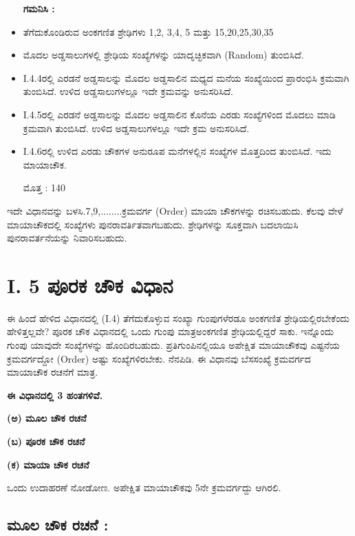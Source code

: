 \begin{itemize}
	\textbf{ಗಮನಿಸಿ :}
	\smallskip

	\item ತೆಗೆದುಕೊಂಡಿರುವ ಅಂಕಗಣಿತ ಶ್ರೇಢಿಗಳು 1,2, 3,4, 5 ಮತ್ತು 15,20,25,30,35
	\item ಮೊದಲ ಅಡ್ಡಸಾಲುಗಳಲ್ಲಿ ಶ್ರೇಢಿಯ ಸಂಖ್ಯೆಗಳನ್ನು ಯಾದೃಚ್ಛಿಕವಾಗಿ (Random) ತುಂಬಿಸಿದೆ.
	\item I.4.4ರಲ್ಲಿ ಎರಡನೆ ಅಡ್ಡಸಾಲನ್ನು ಮೊದಲ ಅಡ್ಡಸಾಲಿನ ಮಧ್ಯದ ಮನೆಯ ಸಂಖ್ಯೆಯಿಂದ ಪ್ರಾರಂಭಿಸಿ ಕ್ರಮವಾಗಿ ತುಂಬಿಸಿದೆ. ಉಳಿದ ಅಡ್ಡಸಾಲುಗಳಲ್ಲೂ ಇದೇ ಕ್ರಮ\-ವನ್ನು ಅನುಸರಿಸಿದೆ.
	\item I.4.5ರಲ್ಲಿ ಎರಡನೆ ಅಡ್ಡಸಾಲನ್ನು ಮೊದಲ ಅಡ್ಡಸಾಲಿನ ಕೊನೆಯ ಎರಡು ಸಂಖ್ಯೆ\-ಗಳಿಂದ ಮೊದಲು ಮಾಡಿ ಕ್ರಮವಾಗಿ ತುಂಬಿಸಿದೆ. ಉಳಿದ ಅಡ್ಡಸಾಲುಗಳಲ್ಲೂ ಇದೇ ಕ್ರಮ ಅನುಸರಿಸಿದೆ.
	\item I.4.6ರಲ್ಲಿ ಉಳಿದ ಎರಡು ಚೌಕಗಳ ಅನುರೂಪ ಮನೆಗಳಲ್ಲಿನ ಸಂಖ್ಯೆಗಳ ಮೊತ್ತದಿಂದ ತುಂಬಿಸಿದೆ. ಇದು ಮಾಯಾಚೌಕ.

	ಮೊತ್ತ : 140
\end{itemize}
ಇದೇ ವಿಧಾನವನ್ನು ಬಳಸಿ.7,9,........ಕ್ರಮವರ್ಗ (Order) ಮಾಯಾ ಚೌಕಗಳನ್ನು ರಚಿಸ\-ಬಹುದು. ಕೆಲವು ವೇಳೆ ಮಾಯಾಚೌಕದಲ್ಲಿ ಸಂಖ್ಯೆಗಳು ಪುನರಾವರ್ತಿತವಾಗಬಹುದು. ಶ್ರೇಢಿ\-ಗಳನ್ನು ಸೂಕ್ತವಾಗಿ ಬದಲಾಯಿಸಿ ಪುನರಾವರ್ತನೆಯನ್ನು ನಿವಾರಿಸಬಹುದು.

\newpage

\section*{I. 5 ಪೂರಕ ಚೌಕ ವಿಧಾನ}

ಈ ಹಿಂದೆ ಹೇಳಿದ ವಿಧಾನದಲ್ಲಿ (I.4) ತೆಗೆದುಕೊಳ್ಳುವ ಸಂಖ್ಯಾ ಗುಂಪುಗಳೆರಡೂ ಅಂಕ\-ಗಣಿತ ಶ್ರೇಢಿಯಲ್ಲಿರಬೇಕೆಂದು ಹೇಳಿತ್ತಲ್ಲವೇ? ಪೂರಕ ಚೌಕ ವಿಧಾನದಲ್ಲಿ ಒಂದು ಗುಂಪು ಮಾತ್ರ\break ಅಂಕಗಣಿತ ಶ್ರೇಢಿಯಲ್ಲಿದ್ದರೆ ಸಾಕು. ಇನ್ನೊಂದು ಗುಂಪು ಯಾವುದೇ ಸಂಖ್ಯೆ\-ಗಳನ್ನು ಹೊಂದಿರ\-ಬಹುದು. ಪ್ರತಿಗುಂಪಿನಲ್ಲಿಯೂ ಅಪೇಕ್ಷಿತ ಮಾಯಾಚೌಕವು ಎಷ್ಟನೆಯ ಕ್ರಮ\-ವರ್ಗದ್ದೋ (Order) ಅಷ್ಟು ಸಂಖ್ಯೆಗಳಿರಬೇಕು. ನೆನಪಿಡಿ. ಈ ವಿಧಾನವು ಬೆಸಸಂಖ್ಯೆ ಕ್ರಮ\-ವರ್ಗದ ಮಾಯಾಚೌಕ ರಚನೆಗೆ ಮಾತ್ರ.

\textbf{ಈ ವಿಧಾನದಲ್ಲಿ 3 ಹಂತಗಳಿವೆ.}

\textbf{(ಅ) ಮೂಲ ಚೌಕ ರಚನೆ}

\textbf{(ಬ) ಪೂರಕ ಚೌಕ ರಚನೆ}

\textbf{(ಕ) ಮಾಯಾ ಚೌಕ ರಚನೆ}

ಒಂದು ಉದಾಹರಣೆ ನೋಡೋಣ. ಅಪೇಕ್ಷಿತ ಮಾಯಾಚೌಕವು 5ನೇ ಕ್ರಮವರ್ಗದ್ದು ಆಗಿರಲಿ.

\subsection*{ಮೂಲ ಚೌಕ ರಚನೆ :}

